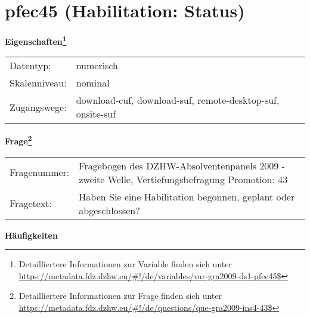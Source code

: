 
    \setcounter{footnote}{0}

    \vspace*{-1.8cm}
	\section{pfec45 (Habilitation: Status)}
	\label{section:pfec45}



    \vspace*{0.5cm}
    \noindent\textbf{Eigenschaften\footnote{Detailliertere Informationen zur Variable finden sich unter
		\url{https://metadata.fdz.dzhw.eu/\#!/de/variables/var-gra2009-ds1-pfec45$}}}\\
	\begin{tabularx}{\hsize}{@{}lX}
	Datentyp: & numerisch \\
	Skalenniveau: & nominal \\
	Zugangswege: &
	  download-cuf, 
	  download-suf, 
	  remote-desktop-suf, 
	  onsite-suf
 \\
    \end{tabularx}



				\vspace*{0.5cm}
                \noindent\textbf{Frage\footnote{Detailliertere Informationen zur Frage finden sich unter
		              \url{https://metadata.fdz.dzhw.eu/\#!/de/questions/que-gra2009-ins4-43$}}}\\
				\begin{tabularx}{\hsize}{@{}lX}
					Fragenummer: &
					  Fragebogen des DZHW-Absolventenpanels 2009 - zweite Welle, Vertiefungsbefragung Promotion:
					  43
 \\
					Fragetext: & Haben Sie eine Habilitation begonnen, geplant oder abgeschlossen? \\
				\end{tabularx}





        		\vspace*{0.5cm}
                \noindent\textbf{Häufigkeiten}


